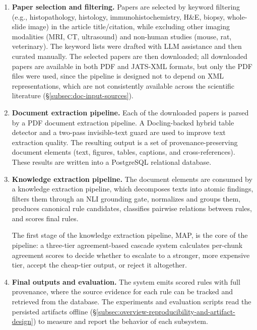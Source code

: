 \begin{enumerate} 

    \item \textbf{Paper selection and filtering.} Papers are selected by keyword filtering (e.g., histopathology, histology, immunohistochemistry, H\&E, biopsy, whole-slide image) in the article title/citation, while excluding other imaging modalities (MRI, CT, ultrasound) and non-human studies (mouse, rat, veterinary). The keyword lists were drafted with LLM assistance and then curated manually. The selected papers are then downloaded; all downloaded papers are available in both PDF and JATS-XML formats, but only the PDF files were used, since the pipeline is designed not to depend on XML representations, which are not consistently available across the scientific literature (§\ref{subsec:doc-input-sources}). 
    
    \item \textbf{Document extraction pipeline.} Each of the downloaded papers is parsed by a PDF document extraction pipeline. A Docling-backed hybrid table detector and a two-pass invisible-text guard are used to improve text extraction quality. The resulting output is a set of provenance-preserving document elements (text, figures, tables, captions, and cross-references). These results are written into a PostgreSQL relational database.
    
    \item \textbf{Knowledge extraction pipeline.} The document elements are consumed by a knowledge extraction pipeline, which decomposes texts into atomic findings, filters them through an NLI grounding gate, normalizes and groups them, produces canonical rule candidates, classifies pairwise relations between rules, and scores final rules. 
    
    The first stage of the knowledge extraction pipeline, MAP, is the core of the pipeline: a three-tier agreement-based cascade system calculates per-chunk agreement scores to decide whether to escalate to a stronger, more expensive tier, accept the cheap-tier output, or reject it altogether.
    
    \item \textbf{Final outputs and evaluation.} The system emits scored rules with full provenance, where the source evidence for each rule can be tracked and retrieved from the database. The experiments and evaluation scripts read the persisted artifacts offline (§\ref{subsec:overview-reproducibility-and-artifact-design}) to measure and report the behavior of each subsystem. 

\end{enumerate}